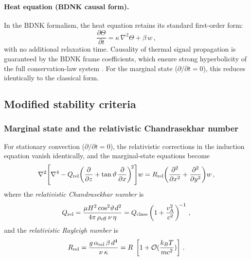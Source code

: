 \paragraph{Heat equation (BDNK causal form).}
In the BDNK formalism, the heat equation retains its standard
first-order form:
\begin{equation}
  \frac{\partial\Theta}{\partial t}
  = \kappa\,\nabla^{2}\Theta + \beta\,w\,,
  \label{eq:rel-heat-BDNK}
\end{equation}
with no additional relaxation time.  Causality of thermal signal
propagation is guaranteed by the BDNK frame coefficients, which
ensure strong hyperbolicity of the full conservation-law system
\citep{BemficaDN2018,Kovtun2019}.  For the marginal state
($\partial/\partial t = 0$), this reduces identically to the classical
form.

\subsection{Modified stability criteria}
\label{subsec:rel-47-stability}

\subsubsection{Marginal state and the relativistic Chandrasekhar number}

For stationary convection ($\partial/\partial t = 0$), the relativistic
corrections in the induction equation vanish identically, and the
marginal-state equations become
\begin{equation}
  \nabla^{2}\!\left[\nabla^{4}
    - Q_{\mathrm{rel}}\!\left(\frac{\partial}{\partial z}
                   + \tan\vartheta\,\frac{\partial}{\partial x}
             \right)^{\!2}\right]\!w
  = R_{\mathrm{rel}}\!
    \left(\frac{\partial^{2}}{\partial x^{2}}
         + \frac{\partial^{2}}{\partial y^{2}}\right)\!w\,,
  \label{eq:rel-4-254}
\end{equation}
where the \emph{relativistic Chandrasekhar number} is
\begin{equation}
  Q_{\mathrm{rel}}
  = \frac{\mu H^{2}\cos^{2}\!\vartheta\;\!d^{2}}{4\pi\,\rho_{\mathrm{eff}}\,\nu\,\eta}
  = Q_{\mathrm{class}}
    \left(1 + \frac{v_{\mathrm{A}}^{2}}{c^{2}}\right)^{\!-1}\,,
  \label{eq:rel-Q-oblique}
\end{equation}
and the \emph{relativistic Rayleigh number} is
\begin{equation}
  R_{\mathrm{rel}}
  = \frac{g\,\alpha_{\mathrm{rel}}\,\beta\,d^{4}}{\nu\,\kappa}
  = R\;\left[1 + \mathcal{O}(\frac{k_{B}T}{mc^{2}})\right]\,.
  \label{eq:rel-R-oblique}
\end{equation}

